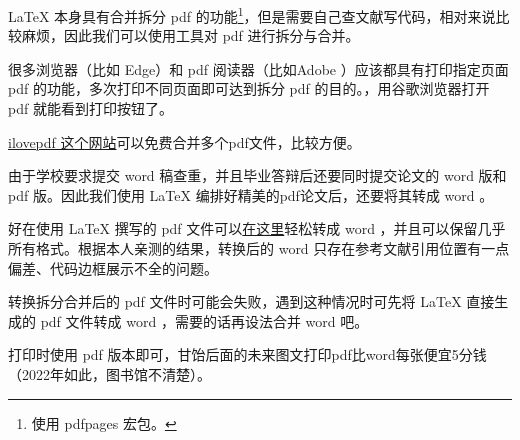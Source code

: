 \LaTeX{} 本身具有合并拆分 pdf 的功能\footnote{使用 pdfpages 宏包。}，但是需要自己查文献写代码，相对来说比较麻烦，因此我们可以使用工具对 pdf 进行拆分与合并。

很多浏览器（比如 Edge）和 pdf 阅读器（比如Adobe ）应该都具有打印指定页面 pdf 的功能，多次打印不同页面即可达到拆分 pdf 的目的。，用谷歌浏览器打开 pdf 就能看到打印按钮了。

\href{https://www.ilovepdf.com/zh-cn/merge_pdf}{ilovepdf 这个网站}可以免费合并多个pdf文件，比较方便。

由于学校要求提交 word 稿查重，并且毕业答辩后还要同时提交论文的 word 版和 pdf 版。因此我们使用 \LaTeX{} 编排好精美的pdf论文后，还要将其转成 word 。

好在使用 \LaTeX{} 撰写的 pdf 文件可以\href{https://www.pdfwordconvert.com/zh/convertform}{在这里}轻松转成 word ，并且可以保留几乎所有格式。根据本人亲测的结果，转换后的 word 只存在参考文献引用位置有一点偏差、代码边框展示不全的问题。

转换拆分合并后的 pdf 文件时可能会失败，遇到这种情况时可先将 \LaTeX{} 直接生成的 pdf 文件转成 word ，需要的话再设法合并 word 吧。

打印时使用 pdf 版本即可，甘饴后面的未来图文打印pdf比word每张便宜5分钱（2022年如此，图书馆不清楚）。


\label{chap:模板使用说明:end}

\let\filename\undefined
\let\hltext\undefined